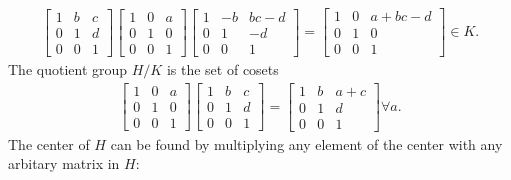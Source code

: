 \documentclass[a4paper,12pt]{article}
\begin{document}
\begin{enumerate}
\begin{align*}
            \left[ \begin{array}{ccc}
                    1 & b & c \\
                    0 & 1 & d \\
                    0 & 0 & 1
            \end{array} \right]
            \left[ \begin{array}{ccc}
                    1 & 0 & a \\
                    0 & 1 & 0 \\
                    0 & 0 & 1
            \end{array} \right]
            \left[ \begin{array}{ccc}
                    1 & -b & bc - d \\
                    0 & 1 & -d \\
                    0 & 0 & 1
            \end{array} \right]
            =
            \left[ \begin{array}{ccc}
                    1 & 0 & a + bc - d \\
                    0 & 1 & 0 \\
                    0 & 0 & 1
            \end{array} \right] \in K.
        \end{align*}
        The quotient group $H/K$ is the set of cosets
        \begin{align*}
            \left[ \begin{array}{ccc}
                    1 & 0 & a \\
                    0 & 1 & 0 \\
                    0 & 0 & 1
            \end{array} \right]
            \left[ \begin{array}{ccc}
                    1 & b & c \\
                    0 & 1 & d \\
                    0 & 0 & 1
            \end{array} \right]
            =
            \left[ \begin{array}{ccc}
                    1 & b & a + c \\
                    0 & 1 & d \\
                    0 & 0 & 1
            \end{array} \right] \forall a.
        \end{align*}
        The center of $H$ can be found by multiplying any element of the center with any arbitary matrix in $H$:

\end{enumerate}
\end{document}
